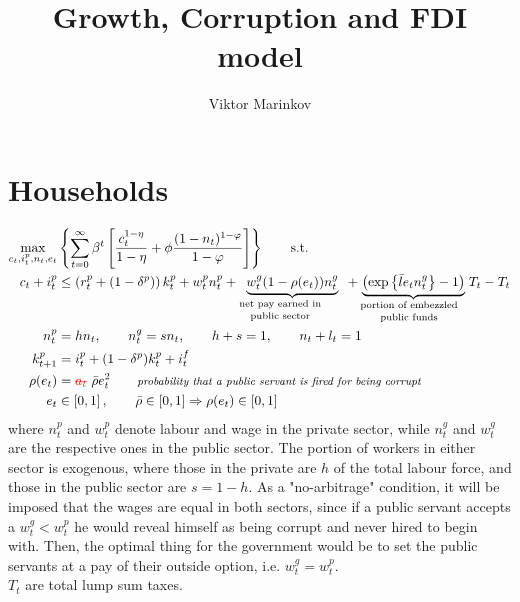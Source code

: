 \documentclass[]{scrartcl}
\title{Growth, Corruption and FDI model}
\author{Viktor Marinkov}
\begin{document}
\maketitle


\section{Households}
\begin{align}
\max_{c_t,i^p_t,n_t,e_t}&\left\lbrace \sum_{t=0}^{\infty}\beta^t\left[ \frac{c_t^{1-\eta}}{1-\eta}+\phi\frac{(1-n_t)^{1-\varphi}}{1-\varphi} \right] \right\rbrace \qquad\text{s.t.}\\
c_t+i^p_t&\leq \left( r^p_t+(1-\delta^p) \right)k^p_t +w^p_t n_t^p+\underbrace{w^g_t (1-\rho(e_t))n^g_t}_{\textrm{\parbox{1.1in}{\shortstack{net pay earned in\\public sector}}}}+\underbrace{\left( \exp\left\lbrace \bar{l}e_tn^g_t \right\rbrace-1 \right)}_{\textrm{\parbox{1.1in}{\shortstack{portion of embezzled\\public funds}}}}T_t-T_t \label{eq:intratempBC}\\
n_t^p&= hn_t,\qquad n_t^g=sn_t,\qquad h+s=1, \qquad n_t+l_t=1\\
k^p_{t+1}&=i^p_t+(1-\delta^p)k_t^p +i^f_t \label{eq:capital}\\
\rho(e_t)&=\text{\textcolor{red}{\sout{$ a_t $}}}~\bar{\rho}e_t^2 \qquad \textit{\footnotesize probability that a public servant is fired for being corrupt}\\
e_t&\in\left[ 0,1 \right], \qquad \bar{\rho}\in[0,1]\Rightarrow \rho(e_t)\in[0,1]
\end{align}
where $ n^p_t $ and $ w^p_t $ denote labour and wage in the private sector, while $ n^g_t $ and $ w^g_t  $ are the respective ones in the public sector. The portion of workers in either sector is exogenous, where those in the private are $ h $ of the total labour force, and those in the public sector are $ s=1-h $. As a "no-arbitrage" condition, it will be imposed that the wages are equal in both sectors, since if a public servant accepts a $ w_t^g<w_t^p $ he would reveal himself as being corrupt and never hired to begin with. Then, the optimal thing for the government would be to set the public servants at a pay of their outside option, i.e. $ w_t^g=w_t^p $.\\ $ T_t $ are total lump sum taxes.
\\\\
\end{document}
